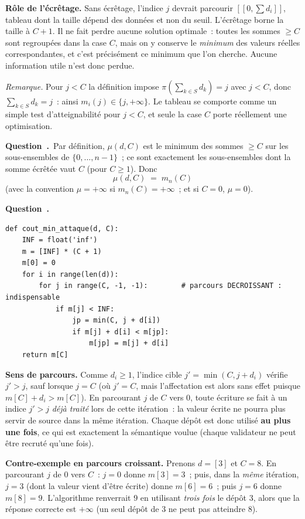 \documentclass[11pt,a4paper]{article}
\renewcommand{\Q}{\medskip\par\stepcounter{qcnt}\noindent\textbf{\color{cnc}Question~\theqcnt.}~}
\begin{document}
\textbf{Rôle de l'écrêtage.} Sans écrêtage, l'indice $j$ devrait parcourir $[\![0,\sum d_i]\!]$,
tableau dont la taille dépend des données et non du seuil. L'écrêtage borne la taille à $C+1$.
Il ne fait perdre aucune solution optimale~: toutes les sommes $\ge C$ sont regroupées dans la
case $C$, mais on y conserve le \emph{minimum} des valeurs réelles correspondantes, et c'est
précisément ce minimum que l'on cherche. Aucune information utile n'est donc perdue.

\emph{Remarque.} Pour $j<C$ la définition impose $\pi(\sum_{k\in S}d_k)=j$ avec $j<C$, donc
$\sum_{k\in S}d_k = j$~: ainsi $m_i(j)\in\{j,+\infty\}$. Le tableau se comporte comme un
simple test d'atteignabilité pour $j<C$, et seule la case $C$ porte réellement une
optimisation.

\Q Par définition, $\mu(d,C)$ est le minimum des sommes $\ge C$ sur les sous-ensembles de
$\{0,\dots,n-1\}$~; ce sont exactement les sous-ensembles dont la somme écrêtée vaut $C$
(pour $C\ge 1$). Donc
\[ \boxed{\ \mu(d,C) \;=\; m_n(C)\ } \]
(avec la convention $\mu=+\infty$ si $m_n(C)=+\infty$~; et si $C=0$, $\mu=0$).

\Q
\begin{lstlisting}
def cout_min_attaque(d, C):
    INF = float('inf')
    m = [INF] * (C + 1)
    m[0] = 0
    for i in range(len(d)):
        for j in range(C, -1, -1):        # parcours DECROISSANT : indispensable
            if m[j] < INF:
                jp = min(C, j + d[i])
                if m[j] + d[i] < m[jp]:
                    m[jp] = m[j] + d[i]
    return m[C]
\end{lstlisting}
\textbf{Sens de parcours.} Comme $d_i\ge 1$, l'indice cible $j'=\min(C,j+d_i)$ vérifie
$j'>j$, sauf lorsque $j=C$ (où $j'=C$, mais l'affectation est alors sans effet puisque
$m[C]+d_i>m[C]$). En parcourant $j$ de $C$ vers $0$, toute écriture se fait à un indice
$j'>j$ \emph{déjà traité} lors de cette itération~: la valeur écrite ne pourra plus servir de
source dans la même itération. Chaque dépôt est donc utilisé \textbf{au plus une fois}, ce
qui est exactement la sémantique voulue (chaque validateur ne peut être recruté qu'une fois).

\textbf{Contre-exemple en parcours croissant.} Prenons $d=[3]$ et $C=8$. En parcourant $j$ de
$0$ vers $C$~: $j=0$ donne $m[3]=3$~; puis, dans la \emph{même} itération, $j=3$ (dont la
valeur vient d'être écrite) donne $m[6]=6$~; puis $j=6$ donne $m[8]=9$. L'algorithme
renverrait $9$ en utilisant \emph{trois fois} le dépôt $3$, alors que la réponse correcte est
$+\infty$ (un seul dépôt de $3$ ne peut pas atteindre $8$).
\end{document}
